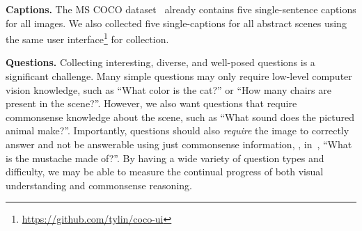 \textbf{Captions.}
The MS COCO dataset~\cite{coco,capeval2015} already contains five single-sentence captions for all images.
We also collected five single-captions for all abstract scenes using the same user interface\footnote{\url{https://github.com/tylin/coco-ui}} for collection.

\textbf{Questions.}
Collecting interesting, diverse, and well-posed questions is a significant challenge.
Many simple questions may only require low-level computer vision knowledge,
such as ``What color is the cat?'' or ``How many chairs are present in the scene?''.
However, we also want questions that require commonsense knowledge about the scene,
such as ``What sound does the pictured animal make?''. Importantly, questions should also \emph{require} the image to correctly answer and not be answerable using just commonsense information, \eg, in~, ``What is the mustache made of?''.  By having a wide variety of
question types and difficulty, we may be able to measure the continual progress of both
visual understanding and commonsense reasoning.

